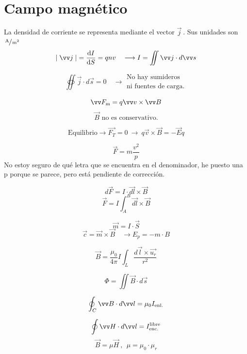 \documentclass[a4paper]{book}
\begin{document}
\newpage
\section{Campo magnético}
\begin{fleqn}
	\begin{multicols}{2}

		\noindent La densidad de corriente se representa mediante el vector $\vec{j} \ $. Sus unidades son $\sfrac{\operatorname{A}}{\operatorname{m} ^2}$
		\[\abs{\; \vec{j}\; } = \dv{I}{S} = qnv \quad \longrightarrow I = \iint{\vec{j}\cdot d \vec{s}}\]

		\[\oiint{\vec{j}\cdot d\vec{s}}=0 \quad \longrightarrow \begin{array}{l}
				\text{No hay sumideros} \\
				\text{ni fuentes de carga.}
			\end{array}\]

		\[\vec{F\subtext{m}}=q \vec{v} \times \vec{B}\]
		\[\vec{B} \text{ no es conservativo.}\]

		\[\text{Equilibrio}\longrightarrow \vec{F_T}=0 \ \longrightarrow \ q \vec{v} \times \vec{B} = - \vec{E} q \]

		\[\vec{F}=m\frac{v^2}{p}\]
		No estoy seguro de qué letra que se encuentra en el denominador, he puesto una p porque se parece, pero está pendiente de corrección.

		\[d\vec{F}=I\cdot \vec{dl}\times \vec{B}\]
		\[\vec{F}=I\int_A^B{\vec{dl}\times\vec{B}}\]
		\columnbreak

		\[\vec{m}=I\cdot \vec{S}\]
		\[\vec{c}=\vec{m}\times \vec{B} \quad \longrightarrow E_p =-m\cdot B\]

		\[\vec{B}=\frac{\mu _0}{4\pi} I \int_L{\frac{d\vec{l}\times\vec{u_r}}{r^2}} \]

		\[\Phi = \iint{\vec{B}\cdot d\vec{s}}\]

		\[\oint_C{\vec{B}\cdot d\vec{l}}=\mu _0 I\subtext{enl.}\]

		\[\oint{\vec{H}\cdot d\vec{l}}= I^{\text{libre}}\subtext{enc.} \]\[ \vec{B}=\mu \vec{H} \ , \ \ \mu = \mu _0 \cdot \mu _r\]


	\end{multicols}
\end{fleqn}
\end{document}
